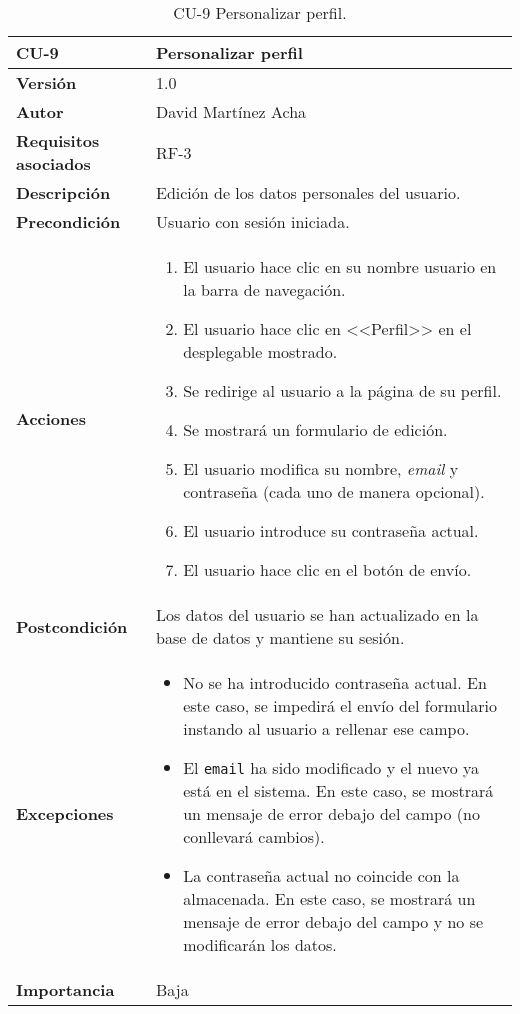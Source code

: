 \begin{table}[p]
	\centering
	\begin{tabularx}{\linewidth}{ p{} p{} }
		\toprule
		\textbf{CU-9}    & \textbf{Personalizar perfil}\\
		\toprule
		\textbf{Versión}              & 1.0    \\
		\textbf{Autor}                & David Martínez Acha \\
		\textbf{Requisitos asociados} & RF-3 \\
		\textbf{Descripción}          & Edición de los datos personales del usuario. \\
		\textbf{Precondición}         & Usuario con sesión iniciada. \\
		\textbf{Acciones}             &
		\begin{enumerate}
			\def\labelenumi{\arabic{enumi}.}
			\tightlist
			\item El usuario hace clic en su nombre usuario en la barra de navegación.
			\item El usuario hace clic en <<Perfil>> en el desplegable mostrado.
			\item Se redirige al usuario a la página de su perfil.
			\item Se mostrará un formulario de edición.
			\item El usuario modifica su nombre, \textit{email} y contraseña (cada uno de manera opcional).
			\item El usuario introduce su contraseña actual.
			\item El usuario hace clic en el botón de envío.
		\end{enumerate}\\
		\textbf{Postcondición}        & Los datos del usuario se han actualizado en la base de datos y mantiene su sesión. \\
		\textbf{Excepciones}          & \begin{itemize}
			\item No se ha introducido contraseña actual. En este caso, se impedirá el envío del formulario instando al usuario a rellenar ese campo.
			\item El \texttt{email} ha sido modificado y el nuevo ya está en el sistema. En este caso, se mostrará un mensaje de error debajo del campo (no conllevará cambios).
			\item La contraseña actual no coincide con la almacenada. En este caso, se mostrará un mensaje de error debajo del campo y no se modificarán los datos.
		\end{itemize}\\
		\textbf{Importancia}          & Baja \\
		\bottomrule
	\end{tabularx}
	\caption{CU-9 Personalizar perfil.}
\end{table}

